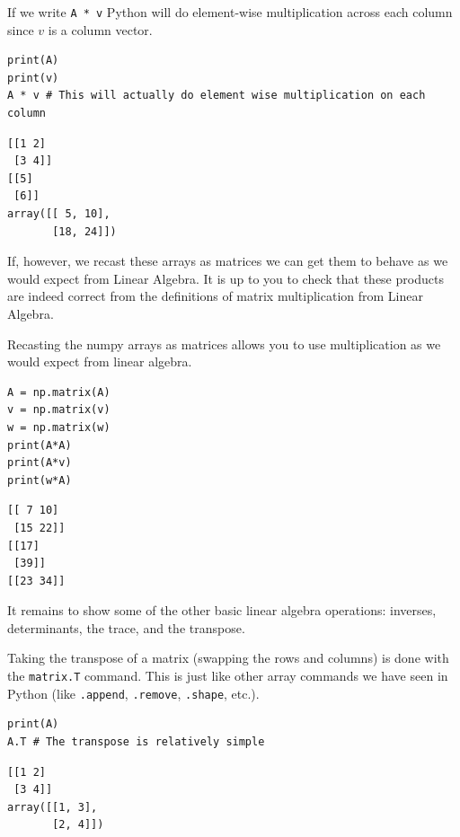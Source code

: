\begin{example}
    If we write \texttt{A * v} Python will do element-wise multiplication across each
    column since $v$ is a column vector.

\bcode
\begin{lstlisting}
print(A)
print(v)
A * v # This will actually do element wise multiplication on each column
\end{lstlisting}
\boutput
\begin{lstlisting}
[[1 2]
 [3 4]]
[[5]
 [6]]
array([[ 5, 10],
       [18, 24]])
\end{lstlisting}

\end{example}

If, however, we recast these arrays as matrices we can get them to behave as we would
expect from Linear Algebra. It is up to you to check that these products are indeed
correct from the definitions of matrix multiplication from Linear Algebra.

\begin{example}
    Recasting the numpy arrays as matrices allows you to use multiplication as we would
    expect from linear algebra.

\bcode
\begin{lstlisting}
A = np.matrix(A)
v = np.matrix(v)
w = np.matrix(w)
print(A*A)
print(A*v)
print(w*A)
\end{lstlisting}
\boutput
\begin{lstlisting}
[[ 7 10]
 [15 22]]
[[17]
 [39]]
[[23 34]]
\end{lstlisting}
    
\end{example}

It remains to show some of the other basic linear algebra operations: inverses,
determinants, the trace, and the transpose.

\begin{example}
    Taking the transpose of a matrix (swapping the rows and columns) is done with the
    \texttt{matrix.T} command.  This is just like other array commands we have seen in
    Python (like \texttt{.append}, \texttt{.remove}, \texttt{.shape}, etc.).  

\bcode
\begin{lstlisting}
print(A)
A.T # The transpose is relatively simple
\end{lstlisting}
\boutput
\begin{lstlisting}
[[1 2]
 [3 4]]
array([[1, 3],
       [2, 4]])
\end{lstlisting}
\end{example}

